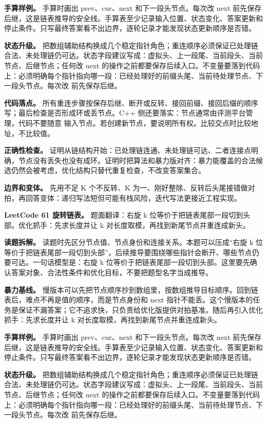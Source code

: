 \textbf{手算样例。} 手算时画出 prev、cur、next 和下一段头节点。每次改 next 前先保存后继，这是链表推导的安全线。手算表至少记录输入位置、状态变化、答案更新和停止条件。只写最终答案看不出边界，逐轮记录才能发现状态更新顺序是否错。

\textbf{状态升级。} 把数组辅助结构换成几个稳定指针角色；重连顺序必须保证已处理链合法、未处理链仍可达。状态字段建议写成：虚拟头、上一段尾、当前段头、当前节点、后继节点；任何改 next 的操作之前都要保存后续入口。不变量要落到代码上：必须明确每个指针指向哪一段：已经处理好的前缀头尾、当前待处理节点、下一段头节点。每次改  前先保存后继。

\textbf{代码落点。} 所有重连步骤按保存后继、断开或反转、接回前缀、接回后缀的顺序写；最后检查是否形成环或丢节点。C++ 侧还要落实：节点通常由评测平台管理，代码不要随意  输入节点。若创建新节点，要说明所有权。比较交点时比较地址，不比较值。

\textbf{正确性检查。} 证明从链结构开始：已处理链连通、未处理链可达、二者连接点明确，节点没有丢失也没有成环。证明时把算法和暴力版对齐：暴力能覆盖的合法候选仍然会被考虑，优化结构只替代重复检查，不改变答案集合。

\textbf{边界和变体。} 先用不足 K 个不反转、K 为一、刚好整除、反转后头尾接错做对拍，再回答变体：递归写法短但可能有栈风险，迭代写法更接近工程实现。

\noindent\textbf{LeetCode 61 旋转链表。} 题面翻译：右旋 k 位等价于把链表尾部一段切到头部。优化抓手：先求长度并让 k 对长度取模，再找到新尾节点并重连成新头。

\textbf{读题拆解。} 读题时先区分节点值、节点身份和连接关系。本题可以压成“右旋 k 位等价于把链表尾部一段切到头部”，后续推导要围绕哪些指针会断开、哪些节点仍要可达。一句话模型是：右旋 k 位等价于把链表尾部一段切到头部。这里要先确认答案对象、合法性条件和优化目标，不要把题型名字当成推导。

\textbf{暴力基线。} 慢版本可以先把节点顺序抄到数组里，按数组推导目标顺序。回到链表后，难点不再是值的顺序，而是节点身份和 next 指针不能丢。这个慢版本的任务是保证不漏答案；它不追求快，只负责给优化版提供对拍基准。随后再引入优化抓手：先求长度并让 k 对长度取模，再找到新尾节点并重连成新头。

\textbf{手算样例。} 手算时画出 prev、cur、next 和下一段头节点。每次改 next 前先保存后继，这是链表推导的安全线。手算表至少记录输入位置、状态变化、答案更新和停止条件。只写最终答案看不出边界，逐轮记录才能发现状态更新顺序是否错。

\textbf{状态升级。} 把数组辅助结构换成几个稳定指针角色；重连顺序必须保证已处理链合法、未处理链仍可达。状态字段建议写成：虚拟头、上一段尾、当前段头、当前节点、后继节点；任何改 next 的操作之前都要保存后续入口。不变量要落到代码上：必须明确每个指针指向哪一段：已经处理好的前缀头尾、当前待处理节点、下一段头节点。每次改  前先保存后继。

